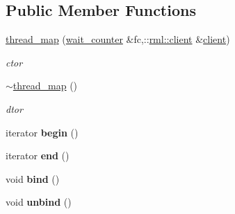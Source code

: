 \subsection*{Public Member Functions}
\begin{DoxyCompactItemize}
\item 
\hypertarget{classrml_1_1internal_1_1thread__map_a7e5265e08e97f46a19b90e1ec8da98dd}{}\hyperlink{classrml_1_1internal_1_1thread__map_a7e5265e08e97f46a19b90e1ec8da98dd}{thread\+\_\+map} (\hyperlink{classrml_1_1internal_1_1wait__counter}{wait\+\_\+counter} \&fc,\+::\hyperlink{classrml_1_1client}{rml\+::client} \&\hyperlink{classrml_1_1client}{client})\label{classrml_1_1internal_1_1thread__map_a7e5265e08e97f46a19b90e1ec8da98dd}

\begin{DoxyCompactList}\small\item\em ctor \end{DoxyCompactList}\item 
\hypertarget{classrml_1_1internal_1_1thread__map_aa335f63e14a336af1245b997089a56ea}{}\hyperlink{classrml_1_1internal_1_1thread__map_aa335f63e14a336af1245b997089a56ea}{$\sim$thread\+\_\+map} ()\label{classrml_1_1internal_1_1thread__map_aa335f63e14a336af1245b997089a56ea}

\begin{DoxyCompactList}\small\item\em dtor \end{DoxyCompactList}\item 
\hypertarget{classrml_1_1internal_1_1thread__map_a49c6d1883cda2ad44a23b97a8eb2caeb}{}iterator {\bfseries begin} ()\label{classrml_1_1internal_1_1thread__map_a49c6d1883cda2ad44a23b97a8eb2caeb}

\item 
\hypertarget{classrml_1_1internal_1_1thread__map_a0151c43180c743744d2300fe38e471fa}{}iterator {\bfseries end} ()\label{classrml_1_1internal_1_1thread__map_a0151c43180c743744d2300fe38e471fa}

\item 
\hypertarget{classrml_1_1internal_1_1thread__map_aa3b385b87eba57de58f1a03b94a9b31e}{}void {\bfseries bind} ()\label{classrml_1_1internal_1_1thread__map_aa3b385b87eba57de58f1a03b94a9b31e}

\item 
\hypertarget{classrml_1_1internal_1_1thread__map_a3c738c51cf0c968aa3976ec532c77b2c}{}void {\bfseries unbind} ()\label{classrml_1_1internal_1_1thread__map_a3c738c51cf0c968aa3976ec532c77b2c}


\end{DoxyCompactItemize}

